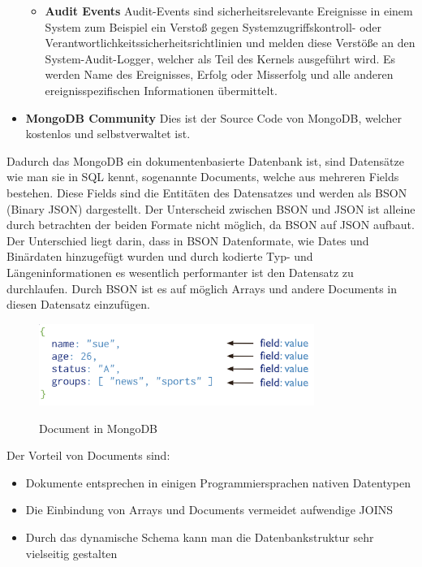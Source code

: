 \begin{itemize}
\begin{itemize}
                \cite{kerberos_auth}
            \item \textbf{Audit Events}
                \newline
                Audit-Events sind sicherheitsrelevante Ereignisse in einem System zum Beispiel ein Verstoß gegen Systemzugriffskontroll- oder Verantwortlichkeitssicherheitsrichtlinien und melden diese Verstöße an den System-Audit-Logger, welcher als Teil des Kernels ausgeführt wird. Es werden Name des Ereignisses, Erfolg oder Misserfolg und alle anderen ereignisspezifischen Informationen übermittelt.
                \cite{audit_events}
\end{itemize}
    \item \textbf{MongoDB Community}
        \newline
        Dies ist der Source Code von MongoDB, welcher kostenlos und selbstverwaltet ist.
\end{itemize}
\cite{mongodb_basics}

Dadurch das MongoDB ein dokumentenbasierte Datenbank ist, sind Datensätze wie man sie in SQL kennt, sogenannte Documents, welche aus mehreren Fields bestehen. Diese Fields sind die Entitäten des Datensatzes und werden als BSON (Binary JSON) dargestellt. Der Unterscheid zwischen BSON und JSON ist alleine durch betrachten der beiden Formate nicht möglich, da BSON auf JSON aufbaut. Der Unterschied liegt darin, dass in BSON Datenformate, wie Dates und Binärdaten hinzugefügt wurden und durch kodierte Typ- und Längeninformationen es wesentlich performanter ist den Datensatz zu durchlaufen. Durch BSON ist es auf möglich Arrays und andere Documents in diesen Datensatz einzufügen.
\cite{mongodb_json_vs_bson}

\begin{figure}[h!]
    \centering
    \includegraphics[width=0.8\textwidth]{pics/document.png}
    \caption{Document in MongoDB}
    \cite{mongodb_document}
    \label{fig:enter-label}
\end{figure}

Der Vorteil von Documents sind:
\begin{itemize}
    \item Dokumente entsprechen in einigen Programmiersprachen nativen Datentypen
    \item Die Einbindung von Arrays und Documents vermeidet aufwendige JOINS
    \item Durch das dynamische Schema kann man die Datenbankstruktur sehr vielseitig gestalten
\end{itemize}